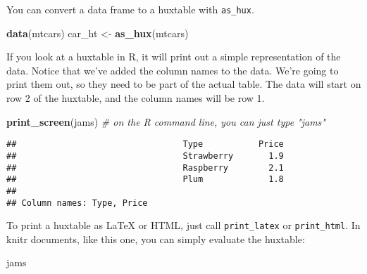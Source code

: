\documentclass[]{article}
\newenvironment{Shaded}{\begin{snugshade}}{\end{snugshade}}
\newcommand{\CommentTok}[1]{\textcolor[rgb]{0.56,0.35,0.01}{\textit{#1}}}
\newcommand{\KeywordTok}[1]{\textcolor[rgb]{0.13,0.29,0.53}{\textbf{#1}}}
\newcommand{\NormalTok}[1]{#1}
\newcommand{\StringTok}[1]{\textcolor[rgb]{0.31,0.60,0.02}{#1}}
\begin{document}
\FloatBarrier

You can convert a data frame to a huxtable with \texttt{as\_hux}.

\begin{Shaded}
\begin{Highlighting}[]
\KeywordTok{data}\NormalTok{(mtcars)}
\NormalTok{car_ht <-}\StringTok{ }\KeywordTok{as_hux}\NormalTok{(mtcars)}
\end{Highlighting}
\end{Shaded}

\FloatBarrier

If you look at a huxtable in R, it will print out a simple
representation of the data. Notice that we've added the column names to
the data. We're going to print them out, so they need to be part of the
actual table. The data will start on row 2 of the huxtable, and the
column names will be row 1.

\begin{Shaded}
\begin{Highlighting}[]
\KeywordTok{print_screen}\NormalTok{(jams)     }\CommentTok{# on the R command line, you can just type "jams"}
\end{Highlighting}
\end{Shaded}

\begin{verbatim}
##                                 Type           Price  
##                                 Strawberry       1.9  
##                                 Raspberry        2.1  
##                                 Plum             1.8  
## 
## Column names: Type, Price
\end{verbatim}

\FloatBarrier

To print a huxtable as LaTeX or HTML, just call \texttt{print\_latex} or
\texttt{print\_html}. In knitr documents, like this one, you can simply
evaluate the huxtable:

\begin{Shaded}
\begin{Highlighting}[]
\NormalTok{jams}
\end{Highlighting}
\end{Shaded}

 
  \providecommand{\huxb}[2]{\arrayrulecolor[RGB]{#1}\global\arrayrulewidth=#2pt}
  \providecommand{\huxvb}[2]{\color[RGB]{#1}\vrule width #2pt}
  \providecommand{\huxtpad}[1]{\rule{0pt}{#1}}
  \providecommand{\huxbpad}[1]{\rule[-#1]{0pt}{#1}}
\end{document}
